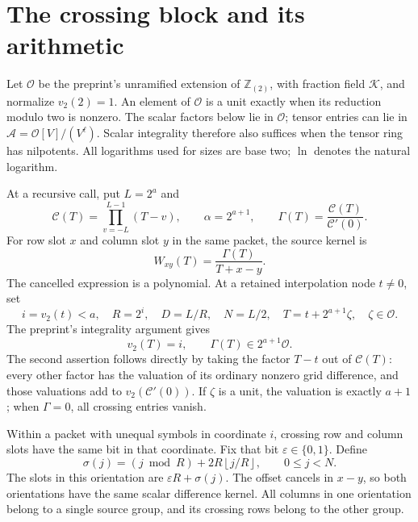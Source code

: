 \documentclass[11pt,letterpaper]{article}
\theoremstyle{definition}\newtheorem{definition}[theorem]{Definition}
\theoremstyle{remark}\newtheorem{remark}[theorem]{Remark}
\newcommand{\OO}{\mathcal O}
\newcommand{\KK}{\mathcal K}
\newcommand{\Aring}{\mathcal A}
\newcommand{\CC}{\mathcal C}
\newcommand{\vTwo}{v_2}
\newcommand{\floor}[1]{\left\lfloor#1\right\rfloor}
\begin{document}
\section{The crossing block and its arithmetic}
\label{sec:block}

Let $\OO$ be the preprint's unramified extension of $\mathbb Z_{(2)}$,
with fraction field $\KK$, and normalize $\vTwo(2)=1$. An element of
$\OO$ is a unit exactly when its reduction modulo two is nonzero.
The scalar factors below lie in $\OO$; tensor entries can lie in
$\Aring=\OO[V]/(V^\ell)$. Scalar integrality therefore also suffices when
the tensor ring has nilpotents. All logarithms used for sizes are base two;
$\ln$ denotes the natural logarithm.

At a recursive call, put $L=2^a$ and
\[
 \CC(T)=\prod_{v=-L}^{L-1}(T-v),\qquad
 \alpha=2^{a+1},\qquad
 \Gamma(T)=\frac{\CC(T)}{\CC'(0)}.
\]
For row slot $x$ and column slot $y$ in the same packet, the source kernel is
\begin{equation}\label{eq:W}
 W_{xy}(T)=\frac{\Gamma(T)}{T+x-y}.
\end{equation}
The cancelled expression is a polynomial. At a retained interpolation node
$t\ne0$, set
\[
 i=\vTwo(t)<a,\quad R=2^i,\quad D=L/R,\quad N=L/2,
 \quad T=t+2^{a+1}\zeta,\quad\zeta\in\OO.
\]
The preprint's integrality argument gives
\begin{equation}\label{eq:gamma}
 \vTwo(T)=i,\qquad \Gamma(T)\in2^{a+1}\OO.
\end{equation}
The second assertion follows directly by taking the factor $T-t$ out of
$\CC(T)$: every other factor has the valuation of its ordinary nonzero
grid difference, and those valuations add to $\vTwo(\CC'(0))$.
If $\zeta$ is a unit, the valuation is exactly $a+1$; when $\Gamma=0$,
all crossing entries vanish.

Within a packet with unequal symbols in coordinate $i$, crossing row and
column slots have the same bit in that coordinate. Fix that bit
$\varepsilon\in\{0,1\}$. Define
\begin{equation}\label{eq:slots}
 \sigma(j)=(j\bmod R)+2R\floor{j/R},\qquad 0\le j<N.
\end{equation}
The slots in this orientation are $\varepsilon R+\sigma(j)$.
The offset cancels in $x-y$, so both orientations have the same scalar
difference kernel. All columns in one orientation belong to a single source
group, and its crossing rows belong to the other group.
\end{document}
